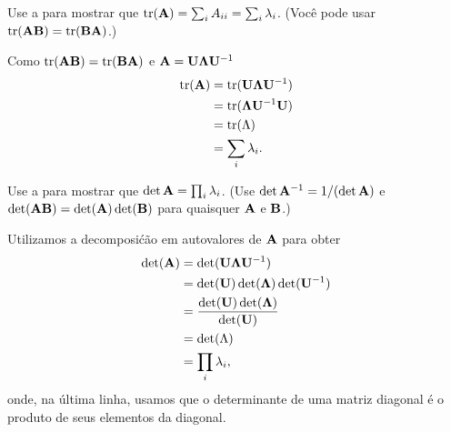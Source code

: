\label{ex:trace-determinants-eigenvalues}
\begin{exenumerate}
    \item Use a  para mostrar que $\operatorname{tr}(\mathbf{A})=\sum_i A_{ii} = \sum_i\lambda_i$. (Voc\^e pode usar $\operatorname{tr}(\mathbf{A}\mathbf{B})=\operatorname{tr}(\mathbf{B}\mathbf{A})$.)
    \begin{solution}
        Como $\operatorname{tr}(\mathbf{A}\mathbf{B}) = \operatorname{tr}(\mathbf{B}\mathbf{A})$ e $\mathbf{A} = \mathbf{U}\mathbf{\Lambda} \mathbf{U}^{-1}$
        \begin{align}
            \operatorname{tr}(\mathbf{A})  &= \operatorname{tr}(\mathbf{U}\mathbf{\Lambda} \mathbf{U}^{-1}) \\
            &= \operatorname{tr}(\mathbf{\Lambda} \mathbf{U}^{-1}\mathbf{U}) \\
            &= \operatorname{tr}(\Lambda)\\
            &= \sum_i \lambda_i.
        \end{align}
    \end{solution}
    
    \item Use a  para mostrar que $\det \mathbf{A} = \prod_i \lambda_i$. (Use $\det \mathbf{A}^{-1}=1/(\det \mathbf{A})$ e $\det(\mathbf{A}\mathbf{B})=\det(\mathbf{A})\det(\mathbf{B})$ para quaisquer $\mathbf{A}$ e $\mathbf{B}$.)
    \begin{solution}
        Utilizamos a decomposi\'c\~ao em autovalores de $\mathbf{A}$ para obter
        \begin{align}
            \det(\mathbf{A}) &= \det(\mathbf{U}\mathbf{\Lambda} \mathbf{U}^{-1})\\
            &= \det(\mathbf{U})\det(\mathbf{\Lambda})\det(\mathbf{U}^{-1}) \\
            &= \frac{\det(\mathbf{U})\det(\mathbf{\Lambda})}{\det(\mathbf{U})}\\
            &= \det(\Lambda)\\
            &= \prod_i \lambda_i,
        \end{align}
        onde, na \'ultima linha, usamos que o determinante de uma matriz diagonal \'e o produto de seus elementos da diagonal.
        
    \end{solution}
\end{exenumerate}



